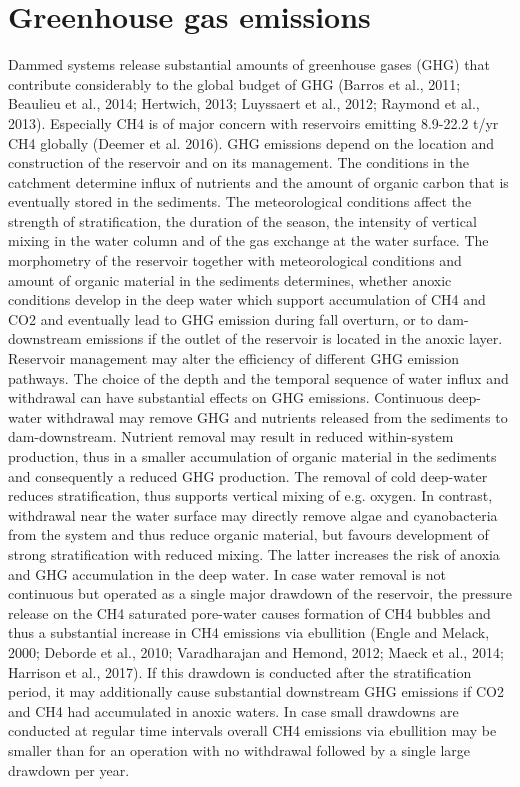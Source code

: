 \section{Greenhouse gas emissions}
\label{sec:1}
Dammed systems release substantial amounts of greenhouse gases (GHG) that contribute considerably to the global budget of GHG (Barros et al., 2011; Beaulieu et al., 2014; Hertwich, 2013; Luyssaert et al., 2012; Raymond et al., 2013). Especially CH4 is of major concern with reservoirs emitting 8.9-22.2 t/yr CH4 globally (Deemer et al. 2016).
GHG emissions depend on the location and construction of the reservoir and on its management. The conditions in the catchment determine influx of nutrients and the amount of organic carbon that is eventually stored in the sediments. The meteorological conditions affect the strength of stratification, the duration of the season, the intensity of vertical mixing in the water column and of the gas exchange at the water surface. The morphometry of the reservoir together with meteorological conditions and amount of organic material in the sediments determines, whether anoxic conditions develop in the deep water which support accumulation of CH4 and CO2 and eventually lead to GHG emission during fall overturn, or to dam-downstream emissions if the outlet of the reservoir is located in the anoxic layer.
Reservoir management may alter the efficiency of different GHG emission pathways. The choice of the depth and the temporal sequence of water influx and withdrawal can have substantial effects on GHG emissions. Continuous deep-water withdrawal may remove GHG and nutrients released from the sediments to dam-downstream. Nutrient removal may result in reduced within-system production, thus in a smaller accumulation of organic material in the sediments and consequently a reduced GHG production. The removal of cold deep-water reduces stratification, thus supports vertical mixing of e.g. oxygen. In contrast, withdrawal near the water surface may directly remove algae and cyanobacteria from the system and thus reduce organic material, but favours development of strong stratification with reduced mixing. The latter increases the risk of anoxia and GHG accumulation in the deep water.
In case water removal is not continuous but operated as a single major drawdown of the reservoir, the pressure release on the CH4 saturated pore-water causes formation of CH4 bubbles and thus a substantial increase in CH4 emissions via ebullition (Engle and Melack, 2000; Deborde et al., 2010; Varadharajan and Hemond, 2012; Maeck et al., 2014; Harrison et al., 2017). If this drawdown is conducted after the stratification period, it may additionally cause substantial downstream GHG emissions if CO2 and CH4 had accumulated in anoxic waters. In case small drawdowns are conducted at regular time intervals overall CH4 emissions via ebullition may be smaller than for an operation with no withdrawal followed by a single large drawdown per year.
